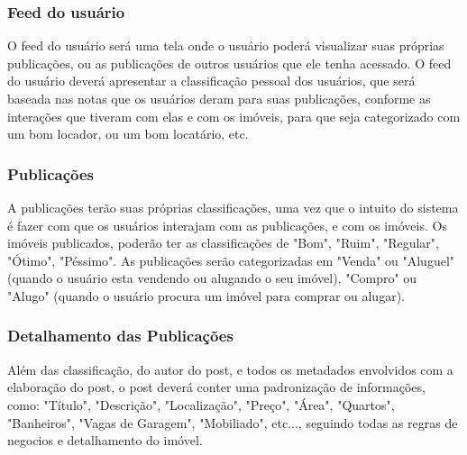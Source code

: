 \documentclass[../main.tex]{subfiles}
\begin{document}
\subsubsection{Feed do usuário}
O feed do usuário será uma tela onde o usuário poderá visualizar suas próprias publicações,
ou as publicações de outros usuários que ele tenha acessado. O feed do usuário deverá 
apresentar a classificação pessoal dos usuários, que será baseada nas notas que os usuários
deram para suas publicações, conforme as interações que tiveram com elas e com os imóveis, 
para que seja categorizado com um bom locador, ou um bom locatário, etc.
\subsubsection{Publicações}
A publicações terão suas próprias classificações, uma vez que o intuito do sistema é
fazer com que os usuários interajam com as publicações, e com os imóveis. Os imóveis
publicados, poderão ter as classificações de "Bom", "Ruim", "Regular", "Ótimo", "Péssimo".
As publicações serão categorizadas em "Venda" ou "Aluguel" (quando o usuário esta 
vendendo ou alugando o seu imóvel), "Compro" ou "Alugo" (quando o usuário procura um 
imóvel para comprar ou alugar).
\subsubsection{Detalhamento das Publicações}
Além das classificação, do autor do post, e todos os metadados envolvidos com a elaboração 
do post, o post deverá conter uma padronização de informações, como: "Título", "Descrição",
"Localização", "Preço", "Área", "Quartos", "Banheiros", "Vagas de Garagem", "Mobiliado", 
etc..., seguindo todas as regras de negocios e detalhamento do imóvel.
\end{document}
